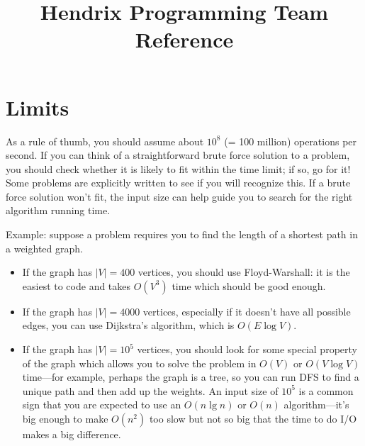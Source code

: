 \documentclass[10pt]{book}
\begin{document}
\title{Hendrix Programming Team Reference}
\maketitle

\tableofcontents
\newpage

\chapter{Limits}

As a rule of thumb, you should assume about $10^8$ (= 100 million)
operations per second.  If you can think of a straightforward brute
force solution to a problem, you should check whether it is likely to
fit within the time limit; if so, go for it!  Some problems are
explicitly written to see if you will recognize this.  If a brute
force solution won't fit, the input size can help guide you to search
for the right algorithm running time.

Example: suppose a problem requires you to find the length of a
shortest path in a weighted graph.
\begin{itemize}
\item If the graph has $|V| = 400$ vertices, you should use
  Floyd-Warshall: it is the easiest to code and takes $O(V^3)$ time
  which should be good enough.
\item If the graph has $|V| = 4000$ vertices, especially if it doesn't
  have all possible edges, you can use Dijkstra's algorithm, which is
  $O(E \log V)$.
\item If the graph has $|V| = 10^5$ vertices, you should look for some
  special property of the graph which allows you to solve the problem
  in $O(V)$ or $O(V \log V)$ time---for example, perhaps the graph is
  a tree, so you can run DFS to find a unique path and then add up the
  weights.  An input size of $10^5$ is a common sign that you are
  expected to use an $O(n \lg n)$ or $O(n)$ algorithm---it's big
  enough to make $O(n^2)$ too slow but not so big that the time to do
  I/O makes a big difference.
\end{itemize}
\end{document}
